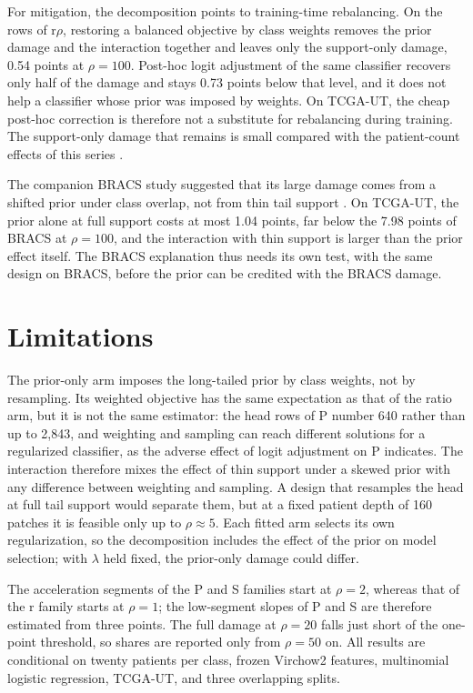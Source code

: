 For mitigation, the decomposition points to training-time rebalancing. On the rows of r$\rho$, restoring a balanced objective by class weights removes the prior damage and the interaction together and leaves only the support-only damage, 0.54 points at $\rho=100$. Post-hoc logit adjustment of the same classifier recovers only half of the damage and stays 0.73 points below that level, and it does not help a classifier whose prior was imposed by weights. On TCGA-UT, the cheap post-hoc correction is therefore not a substitute for rebalancing during training. The support-only damage that remains is small compared with the patient-count effects of this series \citep{queisler2026centreError}.

The companion BRACS study suggested that its large damage comes from a shifted prior under class overlap, not from thin tail support \citep{queisler2026prevalenceBracs}. On TCGA-UT, the prior alone at full support costs at most 1.04 points, far below the 7.98 points of BRACS at $\rho=100$, and the interaction with thin support is larger than the prior effect itself. The BRACS explanation thus needs its own test, with the same design on BRACS, before the prior can be credited with the BRACS damage.

\section{Limitations}
\label{sec:limitations}
The prior-only arm imposes the long-tailed prior by class weights, not by resampling. Its weighted objective has the same expectation as that of the ratio arm, but it is not the same estimator: the head rows of P number 640 rather than up to 2,843, and weighting and sampling can reach different solutions for a regularized classifier, as the adverse effect of logit adjustment on P indicates. The interaction therefore mixes the effect of thin support under a skewed prior with any difference between weighting and sampling. A design that resamples the head at full tail support would separate them, but at a fixed patient depth of 160 patches it is feasible only up to $\rho\approx5$. Each fitted arm selects its own regularization, so the decomposition includes the effect of the prior on model selection; with $\lambda$ held fixed, the prior-only damage could differ.

The acceleration segments of the P and S families start at $\rho=2$, whereas that of the r family starts at $\rho=1$; the low-segment slopes of P and S are therefore estimated from three points. The full damage at $\rho=20$ falls just short of the one-point threshold, so shares are reported only from $\rho=50$ on. All results are conditional on twenty patients per class, frozen Virchow2 features, multinomial logistic regression, TCGA-UT, and three overlapping splits.

